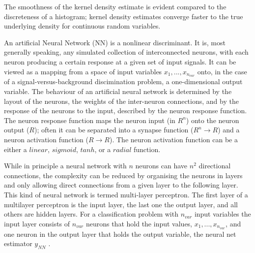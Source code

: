 The smoothness of the kernel density estimate is evident compared to the discreteness of a histogram; kernel density estimates converge faster to the true underlying density for continuous random variables.


An artificial Neural Network (NN) is a nonlinear discriminant. It is, most generally speaking, any simulated collection of interconnected neurons, with each neuron producing a certain response at a given set of input signals. It can be viewed as a mapping from a space of input variables $x_1,...,x_{n_{var}}$ onto, in the case of a signal-versus-background discimination problem, a one-dimensional output variable. The behaviour of an artificial neural network is determined by the layout of the neurons, the weights of the inter-neuron connections, and by the response of the neurons to the input, described by the neuron response function.  %
The neuron response function maps the neuron input (in $R^n$) onto the neuron output ($R$); often it can be separated into a synapse function ($R^n \rightarrow R$) and a neuron activation function ($R \rightarrow R$). The neuron activation function can be a either a $linear$, $sigmoid$, $tanh$, or a $radial$ function.

While in principle a neural network with $n$ neurons can have $n^2$ directional connections, the complexity can be reduced by organising the neurons in layers and only allowing direct connections from a given layer to the following layer. This kind of neural network is termed multi-layer perceptron. The first layer of a multilayer perceptron is the input layer, the last one the output layer, and all others are hidden layers. For a classification problem with $n_{var}$ input variables the input layer consists of $n_{var}$ neurons that hold the input values, $x_1,...,x_{n_{var}}$, and one neuron in the output layer that holds the output variable, the neural net estimator $y_{NN}$ .


